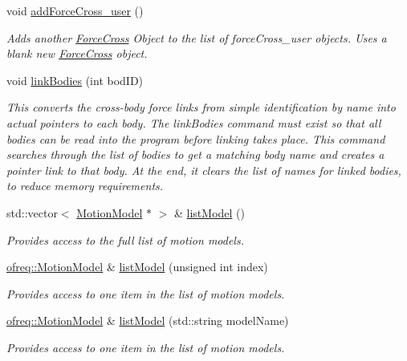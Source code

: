 \begin{DoxyCompactItemize}
void \hyperlink{classosea_1_1ofreq_1_1_system_abc3ad01f3fb22863565a8643202347f4}{add\-Force\-Cross\-\_\-user} ()
\begin{DoxyCompactList}\small\item\em Adds another \hyperlink{classosea_1_1ofreq_1_1_force_cross}{Force\-Cross} Object to the list of force\-Cross\-\_\-user objects. Uses a blank new \hyperlink{classosea_1_1ofreq_1_1_force_cross}{Force\-Cross} object. \end{DoxyCompactList}\item 
void \hyperlink{classosea_1_1ofreq_1_1_system_a280d384672341228d20181ea390118b9}{link\-Bodies} (int bod\-I\-D)
\begin{DoxyCompactList}\small\item\em This converts the cross-\/body force links from simple identification by name into actual pointers to each body. The link\-Bodies command must exist so that all bodies can be read into the program before linking takes place. This command searches through the list of bodies to get a matching body name and creates a pointer link to that body. At the end, it clears the list of names for linked bodies, to reduce memory requirements. \end{DoxyCompactList}\item 
std\-::vector$<$ \hyperlink{classosea_1_1ofreq_1_1_motion_model}{Motion\-Model} $\ast$ $>$ \& \hyperlink{classosea_1_1ofreq_1_1_system_a3a22c0f957f515c951f1cbb32c36b70e}{list\-Model} ()
\begin{DoxyCompactList}\small\item\em Provides access to the full list of motion models. \end{DoxyCompactList}\item 
\hyperlink{classosea_1_1ofreq_1_1_motion_model}{ofreq\-::\-Motion\-Model} \& \hyperlink{classosea_1_1ofreq_1_1_system_abe2ad405661178362ba0cef96a345002}{list\-Model} (unsigned int index)
\begin{DoxyCompactList}\small\item\em Provides access to one item in the list of motion models. \end{DoxyCompactList}\item 
\hyperlink{classosea_1_1ofreq_1_1_motion_model}{ofreq\-::\-Motion\-Model} \& \hyperlink{classosea_1_1ofreq_1_1_system_a65f7eaf3ac522f1dfb60d3f9a47d99ca}{list\-Model} (std\-::string model\-Name)
\begin{DoxyCompactList}\small\item\em Provides access to one item in the list of motion models. \end{DoxyCompactList}\item 

\end{DoxyCompactItemize}
